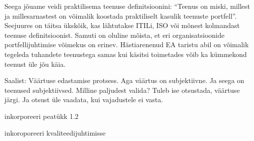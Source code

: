 Seega jõuame veidi praktilisema teenuse definitsioonini: \enquote{Teenus on miski, millest ja millesarnastest on võimalik koostada praktiliselt kasulik teenuste portfell}. Seejuures on täitsa ükskõik, kas lähtutakse ITILi, ISO või mõnest kolmandast teenuse definitsioonist. Samuti on oluline mõista, et eri organisatsioonide portfellijuhtimise võimekus on erinev. Hästiarenenud EA taristu abil on võimalik tegeleda tuhandete teenustega samas kui käsitsi toimetades võib ka kümmekond teenust üle jõu käia.

\TODO Saalist: Väärtuse edastamise protsess. Aga väärtus on subjektiivne. Ja seega on teenused subjektiivsed. Milline paljudest valida? Tuleb ise otsustada, väärtuse järgi. Ja otsust üle vaadata, kui vajadustele ei vasta.

\TODO inkorporeeri \cite{svcthesis} peatükk 1.2 

\TODO inkoroporeeri \cite{myers2011art} kvaliteedijuhtimisse
